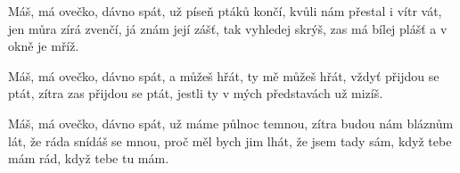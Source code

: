 
\beginverse{}
Máš, má ovečko, dávno spát, už píseň ptáků končí,
kvůli nám přestal i vítr vát, jen můra zírá zvenčí,
já znám její zášť, tak vyhledej skrýš,
zas má bílej plášť a v okně je mříž.
\endverse{}

\beginchorus{}
Máš, má ovečko, dávno spát,
a můžeš hřát, ty mě můžeš hřát,
vždyť přijdou se ptát, zítra zas přijdou se ptát,
jestli ty v mých představách už mizíš.
\endchorus{}

\beginverse{}
Máš, má ovečko, dávno spát, už máme půlnoc temnou,
zítra budou nám bláznům lát, že ráda snídáš se mnou,
proč měl bych jim lhát, že jsem tady sám,
když tebe mám rád, když tebe tu mám.
\endverse{}

\beginchorus{}
\phantom{}
\endchorus{}

\endsong{}
